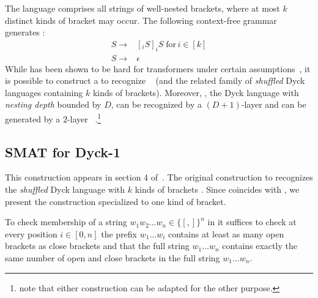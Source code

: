 The language  comprises all strings of well-nested brackets, where at most $k$ distinct kinds of bracket may occur. The following context-free grammar generates :\begin{align*}
    S \rightarrow & [_i S]_iS \; \text{for}\, i \in [k]\\
    S \rightarrow & \epsilon
\end{align*}
While  has been shown to be hard for transformers under certain assumptions~\citep{hahn-2020-theoretical,bhattamishra2020ability}, it is possible to construct a \SMAT{} to recognize ~\citet{bhattamishra2020ability} (and the related family of \textit{shuffled} Dyck languages containing $k$ kinds of brackets). Moreover, , the Dyck language with \textit{nesting depth} bounded by $D$, can be recognized by a $(D+1)$-layer \UHAT{} and can be generated by a $2$-layer ~\citep{yao-2021-self-attention}.\footnote{\citet{yao-2021-self-attention} note that either construction can be adapted for the other purpose.}

\subsection{SMAT for Dyck-1}
This construction appears in section 4 of~\citet{bhattamishra2020ability}. The original construction to recognizes the \textit{shuffled} Dyck language with $k$ kinds of brackets . Since  coincides with , we present the construction specialized to one kind of bracket.

 To check membership of a string $w_1w_2\ldots w_{n} \in \{[,] \}^n$ in  it suffices to check at every position $i \in [0,n]$ the prefix $w_1 \ldots w_i$ contains at least as many open brackets as close brackets and that the full string $w_1 \ldots w_n$ contains exactly the same number of open and close brackets in the full string $w_1\ldots w_n$.

